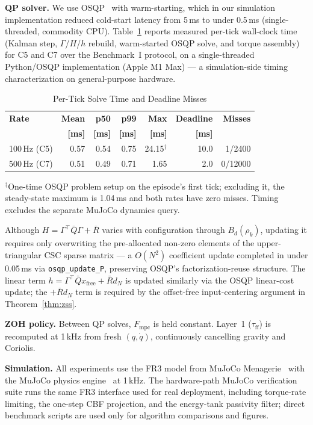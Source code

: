 \documentclass[journal]{IEEEtran}
\newcommand{\Fmpc}{F_{\text{mpc}}}
\begin{document}
\textbf{QP solver.}
We use OSQP~\cite{stellato2020osqp} with warm-starting, which in our
simulation implementation reduced cold-start latency from 5\,ms to under
0.5\,ms (single-threaded, commodity CPU). Table~\ref{tab:timing} reports
measured per-tick wall-clock time (Kalman step, $\Gamma$/$H$/$h$ rebuild,
warm-started OSQP solve, and torque assembly) for C5 and C7 over the
Benchmark~I protocol, on a single-threaded Python/OSQP implementation
(Apple M1 Max) --- a simulation-side timing characterization on
general-purpose hardware.

\begin{table}[!t]
\caption{Per-Tick Solve Time and Deadline Misses}
\label{tab:timing}
\renewcommand{\arraystretch}{1.0}
\centering
\footnotesize
\setlength{\tabcolsep}{3.5pt}
\begin{tabular}{@{}lrrrrrr@{}}
\toprule
\textbf{Rate} & \textbf{Mean} & \textbf{p50} & \textbf{p99} & \textbf{Max} & \textbf{Deadline} & \textbf{Misses}\\
 & \textbf{[ms]} & \textbf{[ms]} & \textbf{[ms]} & \textbf{[ms]} & \textbf{[ms]} &\\
\midrule
100\,Hz (C5) & 0.57 & 0.54 & 0.75 & 24.15$^\dagger$ & 10.0 & 1/2400\\
500\,Hz (C7) & 0.51 & 0.49 & 0.71 & 1.65 & 2.0 & 0/12000\\
\bottomrule
\end{tabular}
\end{table}
\noindent $^\dagger$One-time OSQP problem setup on the episode's first
tick; excluding it, the steady-state maximum is 1.04\,ms and both rates
have zero misses. Timing excludes the separate MuJoCo dynamics query.

Although $H=\Gamma^\top\bar{Q}\Gamma+\bar{R}$ varies with configuration
through $B_d(\rho_k)$, updating it requires only overwriting the
pre-allocated non-zero elements of the upper-triangular CSC sparse
matrix — a $O(N^2)$ coefficient update completed in under 0.05\,ms via
\texttt{osqp\_update\_P}, preserving OSQP's factorization-reuse
structure. The linear term
$h=\Gamma^\top\bar{Q}x_{\text{free}}+\bar R d_N$ is updated similarly
via the OSQP linear-cost update; the $+\bar R d_N$ term is required by
the offset-free input-centering argument in Theorem~\ref{thm:zss}.

\textbf{ZOH policy.}
Between QP solves, $\Fmpc$ is held constant.
Layer~1 ($\tau_{\text{ff}}$) is recomputed at 1\,kHz from fresh
$(q,\dot{q})$, continuously cancelling gravity and Coriolis.

\textbf{Simulation.}
All experiments use the FR3 model from MuJoCo
Menagerie~\cite{mujoco_menagerie} with the MuJoCo physics
engine~\cite{todorov2012mujoco} at 1\,kHz. The hardware-path MuJoCo
verification suite runs the same FR3 interface used for real deployment,
including torque-rate limiting, the one-step CBF projection, and the
energy-tank passivity filter; direct benchmark scripts are used only for
algorithm comparisons and figures.
\end{document}
